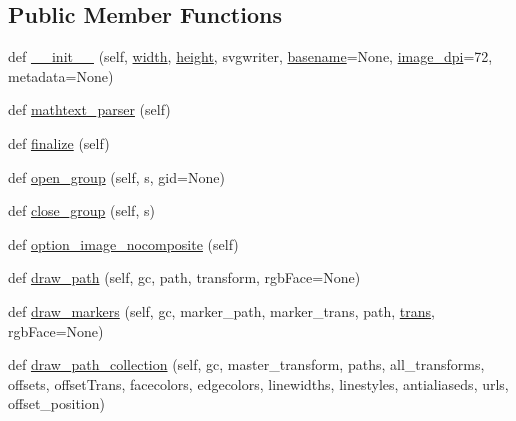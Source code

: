 \subsection*{Public Member Functions}
\begin{DoxyCompactItemize}
\item 
def \hyperlink{classmatplotlib_1_1backends_1_1backend__svg_1_1RendererSVG_a987fbfe48efa00559820bfb58c465cfa}{\+\_\+\+\_\+init\+\_\+\+\_\+} (self, \hyperlink{classmatplotlib_1_1backends_1_1backend__svg_1_1RendererSVG_a1266911c6b66caa35a09c02b4becb44e}{width}, \hyperlink{classmatplotlib_1_1backends_1_1backend__svg_1_1RendererSVG_a7929ca1ac4d24d43339558dc14d813f9}{height}, svgwriter, \hyperlink{classmatplotlib_1_1backends_1_1backend__svg_1_1RendererSVG_a4e284a50c90f9a6925d77b55e91f13f2}{basename}=None, \hyperlink{classmatplotlib_1_1backends_1_1backend__svg_1_1RendererSVG_ae0ea06df53e9740a476c661f92fbddc5}{image\+\_\+dpi}=72, metadata=None)
\item 
def \hyperlink{classmatplotlib_1_1backends_1_1backend__svg_1_1RendererSVG_a8f5ab06433c6df59fa09f1dd0bbe8ace}{mathtext\+\_\+parser} (self)
\item 
def \hyperlink{classmatplotlib_1_1backends_1_1backend__svg_1_1RendererSVG_aed2e0eec58f304fb6cba9d46454187bd}{finalize} (self)
\item 
def \hyperlink{classmatplotlib_1_1backends_1_1backend__svg_1_1RendererSVG_a72546fdefaa28ca159ebaa6e812ae88a}{open\+\_\+group} (self, s, gid=None)
\item 
def \hyperlink{classmatplotlib_1_1backends_1_1backend__svg_1_1RendererSVG_ab2fd2df9dfcab648f41ffa30d7dbbb40}{close\+\_\+group} (self, s)
\item 
def \hyperlink{classmatplotlib_1_1backends_1_1backend__svg_1_1RendererSVG_a0f01fb44eed1bde70b8181a057334052}{option\+\_\+image\+\_\+nocomposite} (self)
\item 
def \hyperlink{classmatplotlib_1_1backends_1_1backend__svg_1_1RendererSVG_a62746138fa30db0eb6c2ae4d244b74da}{draw\+\_\+path} (self, gc, path, transform, rgb\+Face=None)
\item 
def \hyperlink{classmatplotlib_1_1backends_1_1backend__svg_1_1RendererSVG_a507f02e8108b3145147e2335df900c0b}{draw\+\_\+markers} (self, gc, marker\+\_\+path, marker\+\_\+trans, path, \hyperlink{size_2foo_8f90_afabfd8da71309850231a00e53c61f106}{trans}, rgb\+Face=None)
\item 
def \hyperlink{classmatplotlib_1_1backends_1_1backend__svg_1_1RendererSVG_ae15743a353f82d7b7a8c62229dab3db2}{draw\+\_\+path\+\_\+collection} (self, gc, master\+\_\+transform, paths, all\+\_\+transforms, offsets, offset\+Trans, facecolors, edgecolors, linewidths, linestyles, antialiaseds, urls, offset\+\_\+position)

\end{DoxyCompactItemize}
